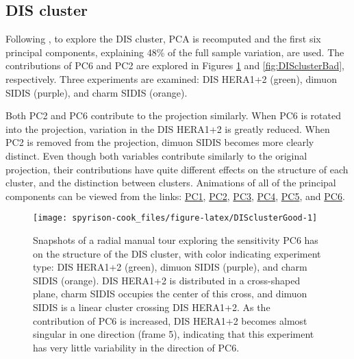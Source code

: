\hypertarget{dis-cluster}{%
\subsection{DIS cluster}\label{dis-cluster}}

Following \citet{cook_dynamical_2018}, to explore the DIS cluster, PCA
is recomputed and the first six principal components, explaining 48\% of
the full sample variation, are used. The contributions of PC6 and PC2
are explored in Figures \ref{fig:DISclusterGood} and
\ref{fig:DISclusterBad}, respectively. Three experiments are examined:
DIS HERA1+2 (green), dimuon SIDIS (purple), and charm SIDIS (orange).

Both PC2 and PC6 contribute to the projection similarly. When PC6 is
rotated into the projection, variation in the DIS HERA1+2 is greatly
reduced. When PC2 is removed from the projection, dimuon SIDIS becomes
more clearly distinct. Even though both variables contribute similarly
to the original projection, their contributions have quite different
effects on the structure of each cluster, and the distinction between
clusters. Animations of all of the principal components can be viewed
from the links:
\href{https://github.com/nspyrison/spinifex_paper/blob/master/paper/gifs/discluster_manualtour_pc1.gif}{PC1},
\href{https://github.com/nspyrison/spinifex_paper/blob/master/paper/gifs/discluster_manualtour_pc2.gif}{PC2},
\href{https://github.com/nspyrison/spinifex_paper/blob/master/paper/gifs/discluster_manualtour_pc3.gif}{PC3},
\href{https://github.com/nspyrison/spinifex_paper/blob/master/paper/gifs/discluster_manualtour_pc4.gif}{PC4},
\href{https://github.com/nspyrison/spinifex_paper/blob/master/paper/gifs/discluster_manualtour_pc5.gif}{PC5},
and
\href{https://github.com/nspyrison/spinifex_paper/blob/master/paper/gifs/discluster_manualtour_pc6.gif}{PC6}.

\begin{Schunk}
\begin{figure}

{\centering \texttt{[image: spyrison-cook\_files/figure-latex/DISclusterGood-1]} 

}

\caption[Snapshots of a radial manual tour exploring the sensitivity PC6 has on the structure of the DIS cluster, with color indicating experiment type]{Snapshots of a radial manual tour exploring the sensitivity PC6 has on the structure of the DIS cluster, with color indicating experiment type: DIS HERA1+2 (green), dimuon SIDIS (purple), and charm SIDIS (orange). DIS HERA1+2 is distributed in a cross-shaped plane, charm SIDIS occupies the center of this cross, and dimuon SIDIS is a linear cluster crossing DIS HERA1+2. As the contribution of PC6 is increased, DIS HERA1+2 becomes almost singular in one direction (frame 5), indicating that this experiment has very little variability in the direction of PC6.}\label{fig:DISclusterGood}
\end{figure}
\end{Schunk}

